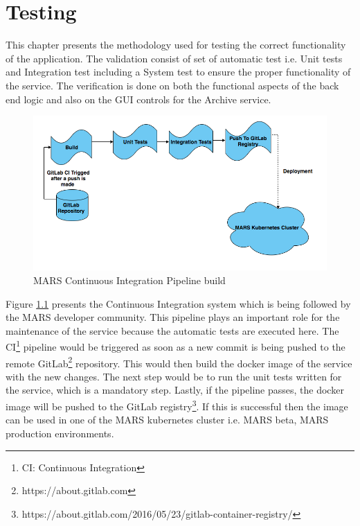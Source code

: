 \chapter{Testing}
\label{chap:testing}
This chapter presents the methodology used for testing the correct functionality of the application. The validation consist of set of automatic test i.e.
Unit tests and Integration test including a System test to ensure the proper functionality of the service. The verification is done on both the functional
aspects of the back end logic and also on the GUI controls for the Archive service.

\begin{figure}[H]
    \centering \includegraphics[scale=0.5]{grafiken/CIbuild.png}
    \caption{MARS Continuous Integration Pipeline build}
    \label{fig:CIbuild}
\end{figure}

Figure \ref{fig:CIbuild} presents the Continuous Integration system which is being followed by the MARS developer community. This pipeline plays an important role
for the maintenance of the service because the automatic tests are executed here.
The CI\footnote{CI: Continuous Integration} pipeline would be triggered as soon as a new commit is being pushed to the remote 
GitLab\footnote{https://about.gitlab.com} repository. This would then build the docker image of the service with the new changes. The next step would be to
run the unit tests written for the service, which is a mandatory step. Lastly, if the pipeline passes, the docker image will be pushed
to the GitLab registry\footnote{https://about.gitlab.com/2016/05/23/gitlab-container-registry/}. If this is successful then the image can be used in one of 
the MARS kubernetes cluster i.e. MARS beta, MARS production environments. 




